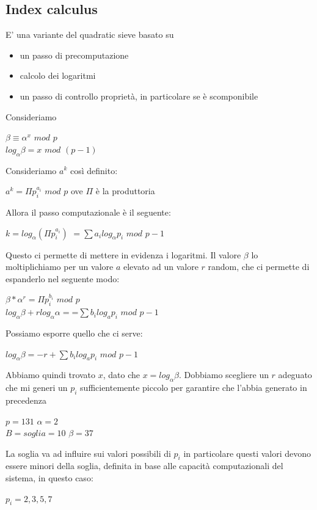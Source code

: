 \documentclass[11pt, oneside]{article}   	%
\begin{document}
\subsection*{Index calculus}
E' una variante del quadratic sieve basato su \begin{itemize}
\item un passo di precomputazione
\item calcolo dei logaritmi 
\item un passo di controllo proprietà, in particolare se è scomponibile
\end{itemize}
Consideriamo\\
\begin{center}
$\beta \equiv \alpha^x$ $mod$ $p$\\
$log_\alpha \beta = x$ $mod$ $(p-1)$
\end{center}
Consideriamo $a^k$ così definito:
\begin{center}
$a^k = \Pi p_i^{a_i}$ $mod$ $p$ ove $\Pi$ è la produttoria 
\end{center}
Allora il passo computazionale è il seguente:
\begin{center}
$k = log_\alpha (\Pi p_i ^{a_i})$
$= \sum a_i log_\alpha p_i$ $mod$ $p-1$
\end{center}
Questo ci permette di mettere in evidenza i logaritmi.
Il valore $\beta$ lo moltiplichiamo per un valore $a$ elevato ad un valore $r$ random, che ci permette di espanderlo nel seguente modo:
\begin{center}
$\beta * \alpha ^ r = \Pi p_i^{b_i}$ $mod$ $p$\\
$log_\alpha \beta + r log_\alpha \alpha = 
$=$ \sum b_i log_a p_i$ $mod$ $p-1$
\end{center}
Possiamo esporre quello che ci serve:
\begin{center}
$log_\alpha \beta = -r + \sum b_i log_a p_i$ $mod$ $p-1$
\end{center}
Abbiamo quindi trovato $x$, dato che $x = log_\alpha \beta$. Dobbiamo scegliere un $r$ adeguato che mi generi un $p_i$ sufficientemente piccolo per garantire che l'abbia generato in precedenza
\begin{center}
$p = 131$ $\alpha = 2$\\
$B = soglia = 10$ $\beta = 37$
\end{center}
La soglia va ad influire sui valori possibili di $p_i$ in particolare questi valori devono essere minori della soglia, definita in base alle capacità computazionali del sistema, in questo caso:
\begin{center}
$p_i = 2, 3, 5, 7$
\end{center}
\end{document}
